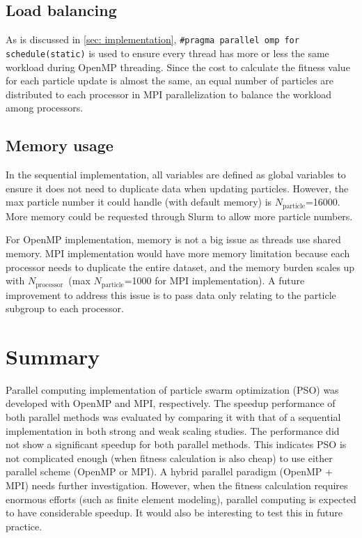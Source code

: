 \documentclass[conference, 10pt]{IEEEtran}
\newcommand{\N}[1]{\ensuremath{N_\text{#1}}}
\newcommand{\Np}{\N{particle}}
\newcommand{\Nproc}{\N{processor}}
\newcommand{\code}[1]{\texttt{\textcolor{BrickRed}{#1}}}
\begin{document}
\subsection{Load balancing}
As is discussed in \cref{sec: implementation}, \code{\#pragma parallel omp for schedule(static)} is used to ensure every thread has more or less the same workload during OpenMP threading.
Since the cost to calculate the fitness value for each particle update is almost the same, an equal number of particles are distributed to each processor in MPI parallelization to balance the workload among processors.

\subsection{Memory usage}
In the sequential implementation, all variables are defined as global variables to ensure it does not need to duplicate data when updating particles.
However, the max particle number it could handle (with default memory) is \Np=16000.
More memory could be requested through Slurm to allow more particle numbers.

For OpenMP implementation, memory is not a big issue as threads use shared memory.
MPI implementation would have more memory limitation because each processor needs to duplicate the entire dataset, and the memory burden scales up with \Nproc\ (max \Np=1000 for MPI implementation).
A future improvement to address this issue is to pass data only relating to the particle subgroup to each processor. 


\section{Summary}
Parallel computing implementation of particle swarm optimization (PSO) was developed with OpenMP and MPI, respectively.
The speedup performance of both parallel methods was evaluated by comparing it with that of a sequential implementation in both strong and weak scaling studies. 
The performance did not show a significant speedup for both parallel methods.
This indicates PSO is not complicated enough (when fitness calculation is also cheap) to use either parallel scheme (OpenMP or MPI). 
A hybrid parallel paradigm (OpenMP + MPI) needs further investigation.
However, when the fitness calculation requires enormous efforts (such as finite element modeling), parallel computing is expected to have considerable speedup.  
It would also be interesting to test this in future practice.
\end{document}
